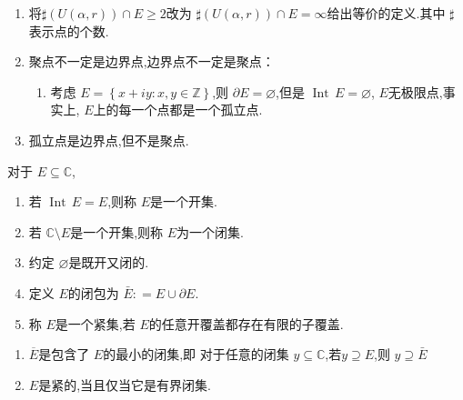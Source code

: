 \documentclass[../../复变函数.tex]{subfiles}
\begin{document}
\begin{remark}
   \begin{enumerate}
    \item  将\(   \sharp (U\left( \alpha ,r \right) )\cap E\ge 2  \)改为 \(   \sharp (U\left( \alpha ,r \right) )\cap E= \infty  \)给出等价的定义.其中 \(  \sharp   \)表示点的个数.   
    \item 聚点不一定是边界点,边界点不一定是聚点：
    \begin{enumerate}
        \item 考虑 \(  E =  \left\{ x+ iy: x,y \in \mathbb{Z}  \right\}  \),则 \(  \partial E =  \varnothing  \),但是 \(  \operatorname{Int}\,E =  \varnothing  \), \(  E  \)无极限点,事实上, \(  E  \)上的每一个点都是一个孤立点.    
    \end{enumerate}
    \item 孤立点是边界点,但不是聚点.
   \end{enumerate}
   
\end{remark}


\begin{definition}
    对于 \(  E \subseteq \mathbb{C}   \), 
    \begin{enumerate}
        \item 若  \(  \operatorname{Int}\,E= E  \),则称 \(  E  \)是一个开集.
        \item 若 \(  \mathbb{C} \setminus E  \)是一个开集,则称 \(  E  \)为一个闭集. 
        \item 约定 \(  \varnothing  \)是既开又闭的.  
        \item 定义 \(  E  \)的闭包为 \(  \bar{E}: = E \cup \partial E  \).  
        \item 称 \(  E  \)是一个紧集,若 \(  E  \)的任意开覆盖都存在有限的子覆盖.    
    \end{enumerate}
    
\end{definition}

\begin{remark}
    \begin{enumerate}
        \item \(  \overline{E}  \)是包含了 \(  E  \)的最小的闭集,即 对于任意的闭集 \(  y\subseteq \mathbb{C}   \),若\(  y\supseteq  E  \),则 \(  y \supseteq \bar{E} \)     
        \item  \(  E  \)是紧的,当且仅当它是有界闭集. 
    \end{enumerate}
    
\end{remark}
\end{document}

